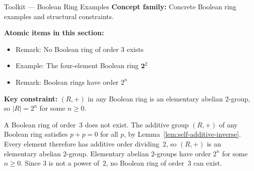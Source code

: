 %
%

\begin{toolkitbox}{Toolkit --- Boolean Ring Examples}
\textbf{Concept family:} Concrete Boolean ring examples and structural
constraints.

\medskip
\textbf{Atomic items in this section:}
\begin{itemize}
  \item Remark: No Boolean ring of order 3 exists
  \item Example: The four-element Boolean ring $\mathbf{2}^2$
  \item Remark: Boolean rings have order $2^n$
\end{itemize}

\medskip
\textbf{Key constraint:} $(R,+)$ in any Boolean ring is an elementary
abelian 2-group, so $|R| = 2^n$ for some $n \ge 0$.
\end{toolkitbox}


\begin{remark*}
A Boolean ring of order~3 does not exist.
The additive group $(R,+)$ of any Boolean ring satisfies
$p + p = 0$ for all $p$, by Lemma~\ref{lem:self-additive-inverse}.
Every element therefore has additive order dividing~2, so
$(R,+)$ is an elementary abelian $2$-group.
Elementary abelian $2$-groups have order $2^n$ for some $n \ge 0$.
Since $3$ is not a power of~$2$, no Boolean ring of order~$3$
can exist.
\end{remark*}


